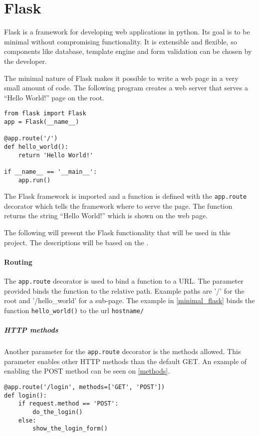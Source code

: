 \section{Flask}
Flask is a framework for developing web applications in python\citep{flask_official}.
Its goal is to be minimal without compromising functionality.
It is extensible and flexible, so components like database, template engine and form validation can be chosen by the developer.

The minimal nature of Flask makes it possible to write a web page in a very small amount of code.
The following program creates a web server that serves a ``Hello World!'' page on the root.

\begin{lstlisting}[style=python, caption='Minimal Flask application', label='minimal_flask']
from flask import Flask
app = Flask(__name__)

@app.route('/')
def hello_world():
    return 'Hello World!'

if __name__ == '__main__':
    app.run()
\end{lstlisting}

The Flask framework is imported and a function is defined with the \texttt{app.route} decorator which tells the framework where to serve the page.
The function returns the string ``Hello World!'' which is shown on the web page.

The following will present the Flask functionality that will be used in this project.
The descriptions will be based on the \citet{flask_docs}.

\paragraph{Routing}
The \texttt{app.route} decorator is used to bind a function to a URL.
The parameter provided binds the function to the relative path.
Example paths are '/' for the root and '/hello\_world' for a sub-page.
The example in \cref{minimal_flask} binds the function \texttt{hello\_world()} to the  url \texttt{hostname/}

\subparagraph{HTTP methods} Another parameter for the \texttt{app.route} decorator is the methods allowed.
This parameter enables other HTTP methods than the default GET.
An example of enabling the POST method can be seen on \cref{methods}.

\begin{lstlisting}[style=python, caption='Enabling POST requests for a login form', label=methods]
@app.route('/login', methods=['GET', 'POST'])
def login():
    if request.method == 'POST':
        do_the_login()
    else:
        show_the_login_form()
\end{lstlisting}

